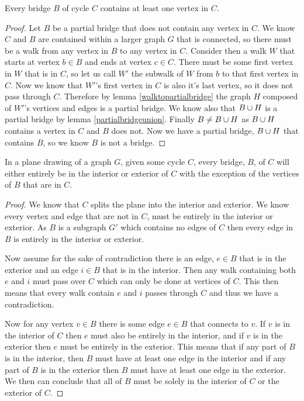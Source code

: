 \documentclass{article}
\begin{document}
\begin{lemma}
	Every bridge $B$ of cycle $C$ contains at least one vertex in $C$.
\end{lemma}
\begin{proof}
	Let $B$ be a partial bridge that does not contain any vertex in $C$. We know $C$ and $B$ are contained within a larger graph $G$ that is connected, so there must be a walk from any vertex in $B$ to any vertex in $C$. Consider then a walk $W$ that starts at vertex $b\in B$ and ends at vertex $c\in C$. There must be some first vertex in $W$ that is in $C$, so let us call $W'$ the subwalk of $W$ from $b$ to that first vertex in $C$. Now we know that $W'$'s first vertex in $C$ is also it's last vertex, so it does not pass through $C$. Therefore by lemma \ref{walktopartialbridge} the graph $H$ composed of $W'$'s vertices and edges is a partial bridge. We know also that $B\cup H$ is a partial bridge by lemma \ref{partialbridgeunion}. Finally $B\not=B\cup H$ as $B\cup H$ contains a vertex in $C$ and $B$ does not. Now we have a partial bridge, $B\cup H$ that contains $B$, so we know $B$ is not a bridge.
\end{proof}

\begin{lemma}
	In a plane drawing of a graph $G$, given some cycle $C$, every bridge, $B$, of $C$ will either entirely be in the interior or exterior of $C$ with the exception of the vertices of $B$ that are in $C$.
\end{lemma}
\begin{proof}
	We know that $C$ splits the plane into the interior and exterior. We know every vertex and edge that are not in $C$, must be entirely in the interior or exterior. As $B$ is a subgraph $G'$ which contains no edges of $C$ then every edge in $B$ is entirely in the interior or exterior.
	
	Now assume for the sake of contradiction there is an edge, $e\in B$ that is in the exterior and an edge $i\in B$ that is in the interior. Then any walk containing both $e$ and $i$ must pass over $C$ which can only be done at vertices of $C$. This then means that every walk contain $e$ and $i$ passes through $C$ and thus we have a contradiction.
	
	Now for any vertex $v\in B$ there is some edge $e\in B$ that connects to $v$. If $v$ is in the interior of $C$ then $e$ must also be entirely in the interior, and if $v$ is in the exterior then $e$ must be entirely in the exterior. This means that if any part of $B$ is in the interior, then $B$ must have at least one edge in the interior and if any part of $B$ is in the exterior then $B$ must have at least one edge in the exterior. We then can conclude that all of $B$ must be solely in the interior of $C$ or the exterior of $C$.
\end{proof}
\end{document}
